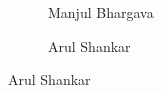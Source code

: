 \begin{frame}[plain]
	\begin{figure}[h]
	\centering
	\begin{subfigure}{0.4\textwidth}
	\captionsetup{labelformat=empty}
	\centering
	\caption{Manjul Bhargava}
	\end{subfigure}
	\begin{subfigure}{0.4\textwidth}
	\captionsetup{labelformat=empty}
	\centering
	\caption{Arul Shankar}
	\end{subfigure}
	\end{figure}
\end{frame}



